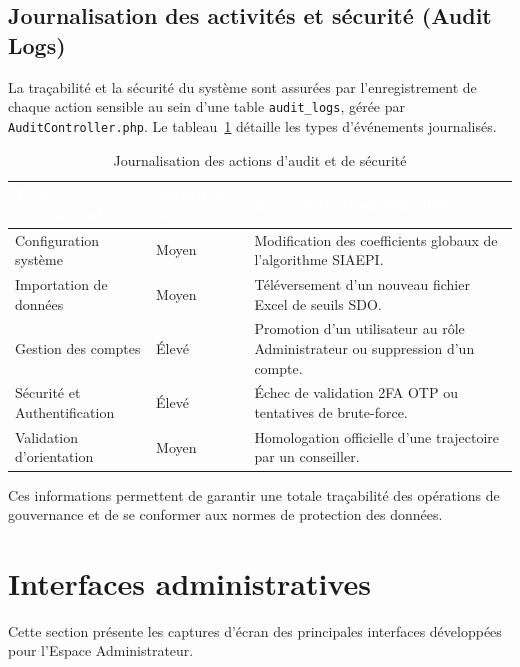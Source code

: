 \subsection{Journalisation des activités et sécurité (Audit Logs)}

La traçabilité et la sécurité du système sont assurées par l'enregistrement de chaque action sensible au sein d'une table \texttt{audit_logs}, gérée par \texttt{AuditController.php}. Le tableau~\ref{tab:audit_logs_types} détaille les types d'événements journalisés.

\begin{table}[H]
\centering
\small
\begin{tabular}{|p{4cm}|p{3.5cm}|p{7.5cm}|}
\hline
\rowcolor{headercolor} 
\textcolor{white}{\textbf{Type d'événement}} & \textcolor{white}{\textbf{Niveau de sévérité}} & \textcolor{white}{\textbf{Exemple d'action journalisée}} \\
\hline
Configuration système & Moyen & Modification des coefficients globaux de l'algorithme SIAEPI. \\
\hline
\rowcolor{rowgray}
Importation de données & Moyen & Téléversement d'un nouveau fichier Excel de seuils SDO. \\
\hline
Gestion des comptes & Élevé & Promotion d'un utilisateur au rôle Administrateur ou suppression d'un compte. \\
\hline
\rowcolor{rowgray}
Sécurité et Authentification & Élevé & Échec de validation 2FA OTP ou tentatives de brute-force. \\
\hline
Validation d'orientation & Moyen & Homologation officielle d'une trajectoire par un conseiller. \\
\hline
\end{tabular}
\caption{Journalisation des actions d'audit et de sécurité}
\label{tab:audit_logs_types}
\end{table}

Ces informations permettent de garantir une totale traçabilité des opérations de gouvernance et de se conformer aux normes de protection des données.

\section{Interfaces administratives}

Cette section présente les captures d'écran des principales interfaces développées pour l'Espace Administrateur.

